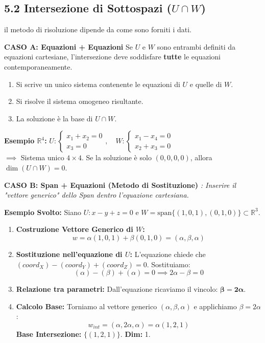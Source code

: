 \documentclass[10pt,a4paper]{article}
\begin{document}
\vspace{0.5cm}

\subsection*{5.2 Intersezione di Sottospazi ($U \cap W$)}
il metodo di risoluzione dipende da come sono forniti i dati.

\textbf{CASO A: Equazioni + Equazioni}
Se $U$ e $W$ sono entrambi definiti da equazioni cartesiane, l'intersezione deve soddisfare \textbf{tutte} le equazioni contemporaneamente.
\begin{enumerate}
    \item Si scrive un unico sistema contenente le equazioni di $U$ e quelle di $W$.
    \item Si risolve il sistema omogeneo risultante.
    \item La soluzione è la base di $U \cap W$.
\end{enumerate}

\textbf{Esempio $\mathbb{R}^4$:}
$U: \begin{cases} x_1+x_2=0 \\ x_3=0 \end{cases}, \quad W: \begin{cases} x_1-x_4=0 \\ x_2+x_3=0 \end{cases}$
\\ $\implies$ Sistema unico $4 \times 4$. Se la soluzione è solo $(0,0,0,0)$, allora $\dim(U \cap W) = 0$.

\medskip

\textbf{CASO B: Span + Equazioni (Metodo di Sostituzione)}
\textit{: Inserire il "vettore generico" dello Span dentro l'equazione cartesiana.}

\textbf{Esempio Svolto:}
Siano $U: x - y + z = 0$ e $W = \text{span}\{ (1, 0, 1), (0, 1, 0) \} \subset \mathbb{R}^3$.
\begin{enumerate}
    \item \textbf{Costruzione Vettore Generico di $W$:}
    \[ w = \alpha(1, 0, 1) + \beta(0, 1, 0) = (\alpha, \beta, \alpha) \]
    
    \item \textbf{Sostituzione nell'equazione di $U$:}
    L'equazione chiede che $(coord_X) - (coord_Y) + (coord_Z) = 0$. Sostituiamo:
    \[ (\alpha) - (\beta) + (\alpha) = 0 \implies 2\alpha - \beta = 0 \]
    
    \item \textbf{Relazione tra parametri:}
    Dall'equazione ricaviamo il vincolo: $\mathbf{\beta = 2\alpha}$.
    
    \item \textbf{Calcolo Base:}
    Torniamo al vettore generico $(\alpha, \beta, \alpha)$ e applichiamo $\beta = 2\alpha$:
    \[ w_{int} = (\alpha, 2\alpha, \alpha) = \alpha(1, 2, 1) \]
    \textbf{Base Intersezione:} $\{ (1, 2, 1) \}$. \textbf{Dim:} 1.
\end{enumerate}
\end{document}
